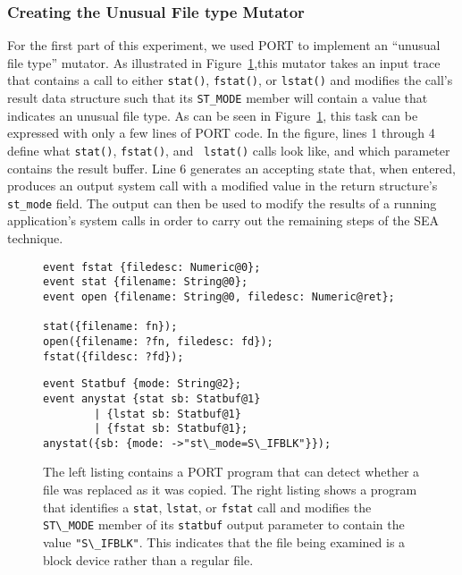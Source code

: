 \subsubsection{Creating the Unusual File type Mutator}
\label{subsub:UnusualFiletype}
For the first part of this experiment,
we used PORT to implement an ``unusual file type''
mutator.
As illustrated in Figure~\ref{lst:SEAListings},this mutator
takes an input trace
that contains a call to either {\tt stat()},
{\tt fstat()},
or {\tt lstat()}
and modifies the call's result data structure such
that its {\tt ST\_MODE} member will contain a value
that indicates an unusual file type.
As can be seen in
Figure~\ref{lst:SEAListings}, this task can be expressed with only a few lines of PORT code.  In the figure,
lines 1 through 4 define what {\tt stat()}, {\tt fstat()}, and {\tt
lstat()} calls look like, and which parameter contains the result buffer.
Line 6 generates an accepting state that, when entered, produces an output
system call with a modified value in the return structure's {\tt st\_mode}
field.  The output can then be used to modify the results of a running
application's system calls in order to carry out the remaining steps of the
SEA technique.

\begin{figure}
\centering
\begin{minipage}{.5\textwidth}
\begin{lstlisting}
event fstat {filedesc: Numeric@0};
event stat {filename: String@0};
event open {filename: String@0, filedesc: Numeric@ret};

stat({filename: fn});
open({filename: ?fn, filedesc: fd});
fstat({fildesc: ?fd});
\end{lstlisting}
\end{minipage}%
\begin{minipage}{.5\textwidth}
\begin{lstlisting}
event Statbuf {mode: String@2};
event anystat {stat sb: Statbuf@1}
        | {lstat sb: Statbuf@1} 
        | {fstat sb: Statbuf@1};
anystat({sb: {mode: ->"st\_mode=S\_IFBLK"}});
\end{lstlisting}
\end{minipage}
\caption{The left listing contains a
PORT program that can detect whether a file was replaced as it was copied.
The right listing shows a program that
identifies a \texttt{stat}, \texttt{lstat}, or \texttt{fstat} call and modifies
  the \lstinline+ST\_MODE+ member of its \lstinline+statbuf+ output parameter to contain the value
  \lstinline+"S\_IFBLK"+. This indicates that the file being examined is a block device rather than a regular file.}
\label{lst:SEAListings}
\end{figure}

